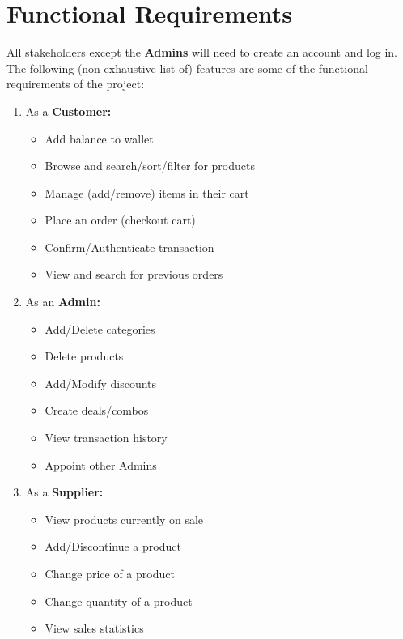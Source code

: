 \documentclass[12pt]{report}
\begin{document}
    \section*{\Huge Functional Requirements}
    \vspace*{10pt}
    All stakeholders except the \textbf{Admins} will need to create an account and log in.
    The following (non-exhaustive list of) features are some of the functional requirements of the project:
    \begin{enumerate}
        \item As a \textbf{Customer:}
        \begin{itemize}
            \item Add balance to wallet
            \item Browse and search/sort/filter for products
            \item Manage (add/remove) items in their cart
            \item Place an order (checkout cart)
            \item Confirm/Authenticate transaction
            \item View and search for previous orders
        \end{itemize}

        \item As an \textbf{Admin:}
        \begin{itemize}
            \item Add/Delete categories
            \item Delete products
            \item Add/Modify discounts
            \item Create deals/combos
            \item View transaction history
            \item Appoint other Admins
        \end{itemize}

        \item As a \textbf{Supplier:}
        \begin{itemize}
            \item View products currently on sale
            \item Add/Discontinue a product
            \item Change price of a product
            \item Change quantity of a product
            \item View sales statistics
        \end{itemize}


\end{enumerate}
\end{document}
